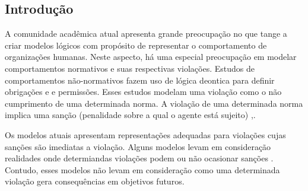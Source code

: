 \documentclass[a0,portrait]{a0poster}
\begin{document}
\begin{multicols}{2} %


\color{Navy} %

\begin{abstract}

\end{abstract}


\color{SaddleBrown} %

\section*{Introdução}

A comunidade acadêmica atual apresenta grande preocupação no que tange a criar modelos lógicos
com propósito de representar o comportamento de organizações humanas. Neste aspecto, há uma 
especial preocupação em modelar comportamentos normativos e suas respectivas violações.
Estudos de comportamentos não-normativos fazem uso de lógica deontica para definir obrigações e 
e permissões. Esses estudos modelam uma violação como o não cumprimento de uma determinada norma. 
A violação de uma determinada norma implica uma sanção (penalidade sobre a qual o agente está sujeito)
\cite{SimulationNonNormative},\cite{ControllingNonNormative}.

Os modelos atuais apresentam representações adequadas para violações cujas sanções são imediatas a 
violação. Alguns modelos levam em consideração realidades onde determiandas violações podem ou não 
ocasionar sanções \cite{HowDoAgentMakeDecision}. Contudo, esses modelos não levam em consideração
como uma determinada violação gera consequências em objetivos futuros. 
		  

\end{multicols}
\end{document}
